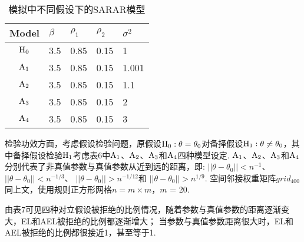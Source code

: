 \documentclass[onecolumn]{ctexart}	%
\begin{document}
\begin{table}[H]
\setlength{\abovecaptionskip}{0.cm}%
\renewcommand\arraystretch{0.8}%
\caption{ 模拟中不同假设下的SARAR模型} 
\begin{tabular*}{\hsize}{@{}@{\extracolsep{\fill}}cllll@{}}
\hline
Model  & $\beta$  & $\rho_1$  & $\rho_2$ & $\sigma^2$\\
\hline
$\rm{H_0}$  &3.5   &0.85 &0.15 &1   \\
$\rm{A_1}$ &3.5   &0.85 &0.15 &1.001  \\
$\rm{A_2}$ &3.5   &0.85 &0.15 &1.1  \\
$\rm{A_3}$  &3.5   &0.85 &0.15 &2   \\
$\rm{A_4}$  &3.5   &0.85 &0.15 &3   \\
\hline
\end{tabular*}
\end{table}

检验功效方面，考虑假设检验问题，原假设$\rm{H_0}:\theta = \theta_0$对备择假设$\rm{H_1}:\theta \neq \theta_0$，其中备择假设检验$\rm{H_1}$考虑表6中$\rm{A_1}$、$\rm{A_2}$、$\rm{A_3}$和$\rm{A_4}$四种模型设定. $\rm{A_1}$、$\rm{A_2}$、$\rm{A_3}$和$\rm{A_4}$分别代表了非真值参数与真值参数从近到远的距离，即: $||\theta-\theta_0||<n^{-1}$、
$ ||\theta-\theta_0||<n^{-1/3}$、
$||\theta-\theta_0||>n^{-1/12} $和
$||\theta-\theta_0|| >n^{1/9}$. 
空间邻接权重矩阵$grid_{400}$同上文，使用规则正方形网格$n=m×m$，$m$ = 20.

由表7可见四种对立假设被拒绝的比例情况，随着参数与真值参数的距离逐渐变大，EL和AEL被拒绝的比例都逐渐增大；  当参数与真值参数距离很大时，EL和AEL被拒绝的比例都很接近1，甚至等于1.
\end{document}
